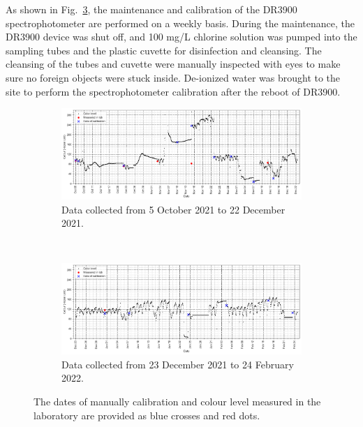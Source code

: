 As shown in Fig.~\ref{fig:colour-calibration-lab-sampling}, the maintenance and calibration of the DR3900 spectrophotometer are performed on a weekly basis. During the maintenance, the DR3900 device was shut off, and 100 mg/L chlorine solution was pumped into the sampling tubes and the plastic cuvette for disinfection and cleansing. The cleansing of the tubes and cuvette were manually inspected with eyes to make sure no foreign objects were stuck inside. De-ionized water was brought to the site to perform the spectrophotometer calibration after the reboot of DR3900.

\begin{figure}[!ht]
  \centering
  \begin{subfigure}[t]{1.0\textwidth}
    \includegraphics[width=\linewidth]{imgs/leachate-effluent-blend-ratio-color-plot/first-80d.png}
    \caption{Data collected from 5 October 2021 to 22 December 2021.} \label{fig:data-oct}
  \end{subfigure}\\
  \vspace{2em}%
  \begin{subfigure}[t]{1.0\textwidth}
    \includegraphics[width=\linewidth]{imgs/leachate-effluent-blend-ratio-color-plot/second-80d.png}
    \caption{Data collected from 23 December 2021 to 24 February 2022.} \label{fig:data-nov}
  \end{subfigure}%
\caption{The dates of manually calibration and colour level measured in the laboratory are provided as blue crosses and red dots.} \label{fig:colour-calibration-lab-sampling}
\end{figure}

